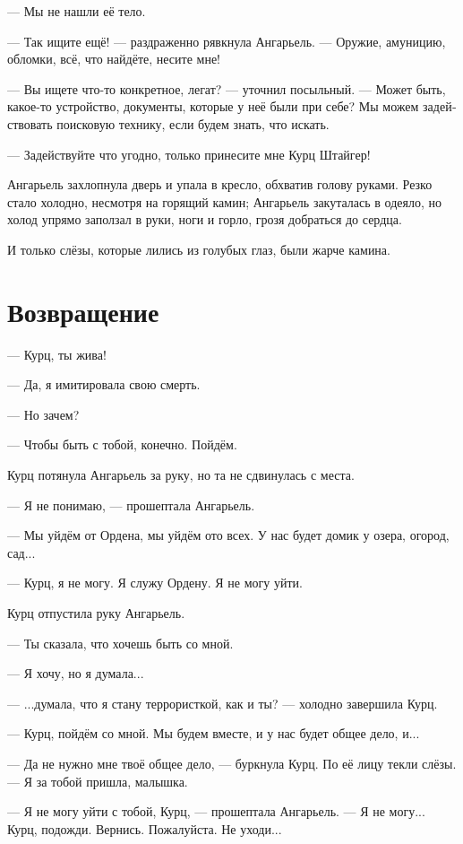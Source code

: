 \documentclass[a4paper,12pt,fleqn]{book}\usepackage{cooltooltips}\usepackage{polyglossia}\setdefaultlanguage[babelshorthands=true]{russian}\setotherlanguage{english}\defaultfontfeatures{Ligatures=TeX,Mapping=tex-text} \usepackage{xcolor}\definecolor{lightgray}{HTML}{bbbbbb}\color{lightgray}\newcommand{\ml}[3]{\textenglish{\textcolor{black}{#3}}}
\begin{document}
--- Мы не нашли её тело.

--- Так ищите ещё! --- раздраженно рявкнула Ангарьель.
--- Оружие, амуницию, обломки, всё, что найдёте, несите мне!

--- Вы ищете что-то конкретное, легат? --- уточнил посыльный.
--- Может быть, какое-то устройство, документы, которые у неё были при себе?
Мы можем задействовать поисковую технику, если будем знать, что искать.

--- Задействуйте что угодно, только принесите мне Курц Штайгер!

Ангарьель захлопнула дверь и упала в кресло, обхватив голову руками.
Резко стало холодно, несмотря на горящий камин;
Ангарьель закуталась в одеяло, но холод упрямо заползал в руки, ноги и горло, грозя добраться до сердца.

И только слёзы, которые лились из голубых глаз, были жарче камина. 

\section{Возвращение}

--- Курц, ты жива!

--- Да, я имитировала свою смерть.

--- Но зачем?

--- Чтобы быть с тобой, конечно.
Пойдём.

Курц потянула Ангарьель за руку, но та не сдвинулась с места.

--- Я не понимаю, --- прошептала Ангарьель.

--- Мы уйдём от Ордена, мы уйдём ото всех.
У нас будет домик у озера, огород, сад...

--- Курц, я не могу.
Я служу Ордену.
Я не могу уйти.

Курц отпустила руку Ангарьель.

--- Ты сказала, что хочешь быть со мной.

--- Я хочу, но я думала...

--- ...думала, что я стану террористкой, как и ты? --- холодно завершила Курц.

--- Курц, пойдём со мной.
Мы будем вместе, и у нас будет общее дело, и...

--- Да не нужно мне твоё общее дело, --- буркнула Курц.
По её лицу текли слёзы.
--- Я за тобой пришла, малышка.

--- Я не могу уйти с тобой, Курц, --- прошептала Ангарьель.
--- Я не могу...
Курц, подожди.
Вернись.
Пожалуйста.
Не уходи...
\end{document}
